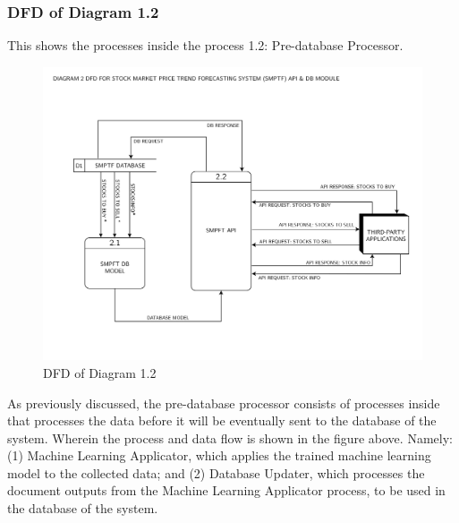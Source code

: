 \subsubsection{DFD of Diagram 1.2}
\label{subsubsec: dfd1.2}
This shows the processes inside the process 1.2: 
Pre-database Processor.
\begin{figure}[ht]
    \centering
    \includegraphics[width=1\textwidth]{./assets/Data Flow Diagram-04.png}
    \caption{DFD of Diagram 1.2}
    \label{fig:dfd1.2}
\end{figure}
\FloatBarrier
\vspace{0.5cm}
As previously discussed, the pre-database processor consists of processes 
inside that processes the data before it will be eventually sent to the database 
of the system. Wherein the process and data flow is shown in the figure above. 
Namely: (1) Machine Learning Applicator, which applies the trained machine learning 
model to the collected data; and 
(2) Database Updater, which processes the document outputs from the Machine 
Learning Applicator process, to be used in the database of the system.
\vspace{0.5cm}
